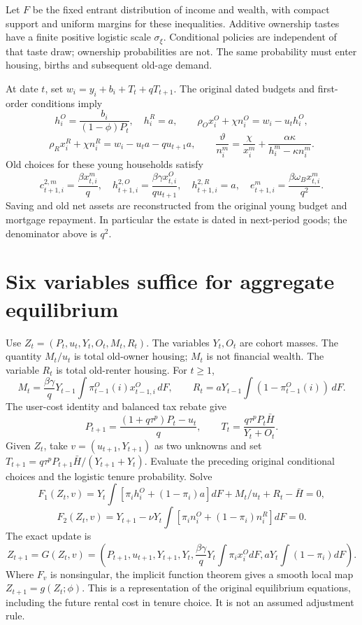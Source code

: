 \documentclass[
  11pt,
]{article}
\begin{document}
Let \(F\) be the fixed entrant distribution of income and wealth, with
compact support and uniform margins for these inequalities. Additive
ownership tastes have a finite positive logistic scale \(\sigma_\xi\).
Conditional policies are independent of that taste draw; ownership
probabilities are not. The same probability must enter housing, births
and subsequent old-age demand.

At date \(t\), set \(w_i=y_i+b_i+T_t+qT_{t+1}\). The original dated
budgets and first-order conditions imply \[
 h_i^O=\frac{b_i}{(1-\phi)P_t},\quad h_i^R=a,\qquad
 \rho_Ox_i^O+\chi n_i^O=w_i-u_th_i^O,
\] \[
 \rho_Rx_i^R+\chi n_i^R=w_i-u_ta-qu_{t+1}a,\qquad
 \frac{\vartheta}{n_i^m}
 =\frac{\chi}{x_i^m}+\frac{\alpha\kappa}{h_i^m-\kappa n_i^m}.
\] Old choices for these young households satisfy \[
 c_{t+1,i}^{2,m}=\frac{\beta x_{t,i}^m}{q},\quad
 h_{t+1,i}^{2,O}=\frac{\beta\gamma x_{t,i}^O}{q u_{t+1}},\quad
 h_{t+1,i}^{2,R}=a,\quad
 e_{t+1,i}^m=\frac{\beta\omega_Bx_{t,i}^m}{q^2}.
\] Saving and old net assets are reconstructed from the original young
budget and mortgage repayment. In particular the estate is dated in
next-period goods; the denominator above is \(q^2\).

\section{Six variables suffice for aggregate
equilibrium}\label{six-variables-suffice-for-aggregate-equilibrium}

Use \(Z_t=(P_t,u_t,Y_t,O_t,M_t,R_t)\). The variables \(Y_t,O_t\) are
cohort masses. The quantity \(M_t/u_t\) is total old-owner housing;
\(M_t\) is not financial wealth. The variable \(R_t\) is total
old-renter housing. For \(t\geq1\), \[
 M_t=\frac{\beta\gamma}{q}Y_{t-1}
       \int\pi_{t-1}^O(i)x_{t-1,i}^O\,dF,
 \qquad
 R_t=aY_{t-1}\int(1-\pi_{t-1}^O(i))\,dF.
\] The user-cost identity and balanced tax rebate give \[
 P_{t+1}=\frac{(1+q\tau^p)P_t-u_t}{q},\qquad
 T_t=\frac{q\tau^pP_t\bar H}{Y_t+O_t}.
\] Given \(Z_t\), take \(v=(u_{t+1},Y_{t+1})\) as two unknowns and set
\(T_{t+1}=q\tau^pP_{t+1}\bar H/(Y_{t+1}+Y_t)\). Evaluate the preceding
original conditional choices and the logistic tenure probability. Solve
\[
 F_1(Z_t,v)=Y_t\int[\pi_i h_i^O+(1-\pi_i)a]dF
                    +M_t/u_t+R_t-\bar H=0,
\] \[
 F_2(Z_t,v)=Y_{t+1}-\nu Y_t
                 \int[\pi_i n_i^O+(1-\pi_i)n_i^R]dF=0.
\] The exact update is \[
 Z_{t+1}=G(Z_t,v)=
 \left(P_{t+1},u_{t+1},Y_{t+1},Y_t,
 \frac{\beta\gamma}{q}Y_t\int\pi_i x_i^OdF,
 aY_t\int(1-\pi_i)dF\right).
\] Where \(F_v\) is nonsingular, the implicit function theorem gives a
smooth local map \(Z_{t+1}=g(Z_t;\phi)\). This is a representation of
the original equilibrium equations, including the future rental cost in
tenure choice. It is not an assumed adjustment rule.
\end{document}
